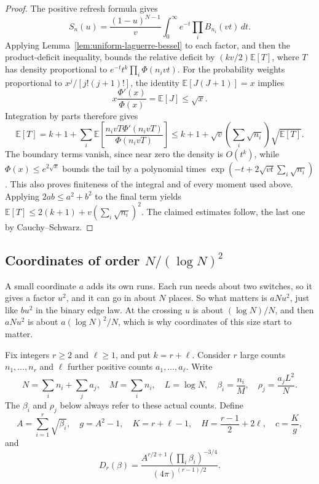 \begin{proof}
The positive refresh formula gives
\[
S_n(u)=\frac{(1-u)^{N-1}}v
\int_0^\infty e^{-t}\prod_iB_{n_i}(vt)\,dt.
\]
Applying Lemma~\ref{lem:uniform-laguerre-bessel} to each factor, and then
the product-deficit inequality, bounds the relative deficit by
$(kv/2)\mathbb E[T]$, where $T$ has density proportional to
$e^{-t}t^k\prod_i\Phi(n_i vt)$.
For the probability weights proportional to $x^j/[j!(j+1)!]$, the identity
$\mathbb E[J(J+1)]=x$ implies
\[
x\frac{\Phi'(x)}{\Phi(x)}=\mathbb E[J]\le\sqrt{x}.
\]
Integration by parts therefore gives
\[
\mathbb E[T]=k+1+
\sum_i\mathbb E\!\left[\frac{n_ivT\Phi'(n_ivT)}{\Phi(n_ivT)}\right]
\le k+1+\sqrt v\left(\sum_i\sqrt{n_i}\right)\sqrt{\mathbb E[T]}.
\]
The boundary terms vanish, since near zero the density is $O(t^k)$, while
$\Phi(x)\le e^{2\sqrt{x}}$ bounds the tail by a polynomial times
$\exp(-t+2\sqrt{vt}\sum_i\sqrt{n_i})$. This also proves finiteness of
the integral and of every moment used above. Applying $2ab\le a^2+b^2$
to the final term yields
$\mathbb E[T]\le2(k+1)+v(\sum_i\sqrt{n_i})^2$.
The claimed estimates follow, the last one by Cauchy--Schwarz.
\end{proof}

\subsection{Coordinates of order \texorpdfstring{$N/(\log N)^2$}{N divided by (log N) squared}}

A small coordinate $a$ adds its own runs. Each run needs about two switches,
so it gives a factor $u^2$, and it can go in about $N$ places. So what
matters is $aNu^2$, just like $bu^2$ in the binary edge law. At the crossing
$u$ is about $(\log N)/N$, and then $aNu^2$ is about $a(\log N)^2/N$, which
is why coordinates of this size start to matter.

Fix integers $r\ge2$ and $\ell\ge1$, and put $k=r+\ell$.
Consider $r$ large counts $n_1,\ldots,n_r$ and $\ell$ further positive
counts $a_1,\ldots,a_\ell$. Write
\[
N=\sum_i n_i+\sum_j a_j,\quad M=\sum_i n_i,\quad
L=\log N,\quad \beta_i=\frac{n_i}{M},\quad
\rho_j=\frac{a_jL^2}{N}.
\]
The $\beta_i$ and $\rho_j$ below always refer to these actual counts.
Define
\[
A=\sum_{i=1}^r\sqrt{\beta_i},\quad g=A^2-1,\quad
K=r+\ell-1,\quad H=\frac{r-1}{2}+2\ell,\quad c=\frac Kg,
\]
and
\[
D_r(\beta)=\frac{A^{r/2+1}(\prod_i\beta_i)^{-3/4}}
{(4\pi)^{(r-1)/2}}.
\]

